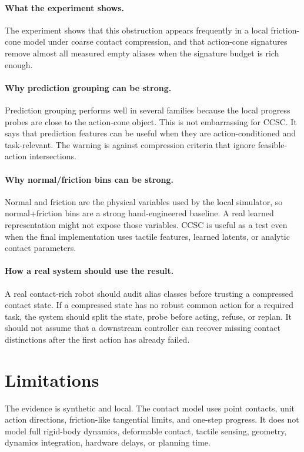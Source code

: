 \documentclass{article}
\begin{document}
\paragraph{What the experiment shows.}
The experiment shows that this obstruction appears frequently in a local friction-cone model under coarse contact compression, and that action-cone signatures remove almost all measured empty aliases when the signature budget is rich enough.

\paragraph{Why prediction grouping can be strong.}
Prediction grouping performs well in several families because the local progress probes are close to the action-cone object. This is not embarrassing for CCSC. It says that prediction features can be useful when they are action-conditioned and task-relevant. The warning is against compression criteria that ignore feasible-action intersections.

\paragraph{Why normal/friction bins can be strong.}
Normal and friction are the physical variables used by the local simulator, so normal+friction bins are a strong hand-engineered baseline. A real learned representation might not expose those variables. CCSC is useful as a test even when the final implementation uses tactile features, learned latents, or analytic contact parameters.

\paragraph{How a real system should use the result.}
A real contact-rich robot should audit alias classes before trusting a compressed contact state. If a compressed state has no robust common action for a required task, the system should split the state, probe before acting, refuse, or replan. It should not assume that a downstream controller can recover missing contact distinctions after the first action has already failed.

\section{Limitations}
The evidence is synthetic and local. The contact model uses point contacts, unit action directions, friction-like tangential limits, and one-step progress. It does not model full rigid-body dynamics, deformable contact, tactile sensing, geometry, dynamics integration, hardware delays, or planning time.
\end{document}
